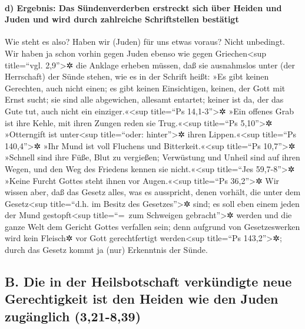 \hypertarget{d-ergebnis-das-suxfcndenverderben-erstreckt-sich-uxfcber-heiden-und-juden-und-wird-durch-zahlreiche-schriftstellen-bestuxe4tigt}{%
\paragraph{d) Ergebnis: Das Sündenverderben erstreckt sich über Heiden
und Juden und wird durch zahlreiche Schriftstellen
bestätigt}\label{d-ergebnis-das-suxfcndenverderben-erstreckt-sich-uxfcber-heiden-und-juden-und-wird-durch-zahlreiche-schriftstellen-bestuxe4tigt}}

 Wie steht es also? Haben wir (Juden) für uns etwas
voraus? Nicht unbedingt. Wir haben ja schon vorhin gegen Juden ebenso
wie gegen Griechen\textless sup title=``vgl. 2,9''\textgreater✲ die
Anklage erheben müssen, daß sie ausnahmslos unter (der Herrschaft) der
Sünde stehen,  wie es in der Schrift heißt: »Es gibt
keinen Gerechten, auch nicht einen;  es gibt keinen
Einsichtigen, keinen, der Gott mit Ernst sucht;  sie sind
alle abgewichen, allesamt entartet; keiner ist da, der das Gute tut,
auch nicht ein einziger.«\textless sup title=``Ps 14,1-3''\textgreater✲
 »Ein offenes Grab ist ihre Kehle, mit ihren Zungen reden
sie Trug.«\textless sup title=``Ps 5,10''\textgreater✲ »Otterngift ist
unter\textless sup title=``oder: hinter''\textgreater✲ ihren
Lippen.«\textless sup title=``Ps 140,4''\textgreater✲ 
»Ihr Mund ist voll Fluchens und Bitterkeit.«\textless sup title=``Ps
10,7''\textgreater✲  »Schnell sind ihre Füße, Blut zu
vergießen;  Verwüstung und Unheil sind auf ihren Wegen,
 und den Weg des Friedens kennen sie nicht.«\textless sup
title=``Jes 59,7-8''\textgreater✲  »Keine Furcht Gottes
steht ihnen vor Augen.«\textless sup title=``Ps 36,2''\textgreater✲
 Wir wissen aber, daß das Gesetz alles, was es
ausspricht, denen vorhält, die unter dem Gesetz\textless sup
title=``d.h. im Besitz des Gesetzes''\textgreater✲ sind; es soll eben
einem jeden der Mund gestopft\textless sup title=``=~zum Schweigen
gebracht''\textgreater✲ werden und die ganze Welt dem Gericht Gottes
verfallen sein;  denn aufgrund von Gesetzeswerken wird
kein Fleisch✲ vor Gott gerechtfertigt werden\textless sup title=``Ps
143,2''\textgreater✲; durch das Gesetz kommt ja (nur) Erkenntnis der
Sünde.

\hypertarget{b.-die-in-der-heilsbotschaft-verkuxfcndigte-neue-gerechtigkeit-ist-den-heiden-wie-den-juden-zuguxe4nglich-321-839}{%
\subsection{B. Die in der Heilsbotschaft verkündigte neue Gerechtigkeit
ist den Heiden wie den Juden zugänglich
(3,21-8,39)}\label{b.-die-in-der-heilsbotschaft-verkuxfcndigte-neue-gerechtigkeit-ist-den-heiden-wie-den-juden-zuguxe4nglich-321-839}}

